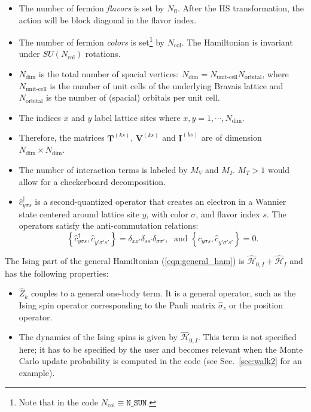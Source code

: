 \begin{itemize}
\item The number of fermion \emph{flavors} is set by $N_{\mathrm{fl}}$.  After the HS transformation, the action will be block diagonal in the flavor index. 
\item The number of fermion \emph{colors} is set\footnote{Note that  in the code $ N_{\mathrm{col}} \equiv \texttt{N\_{SUN}} $.} by $N_{\mathrm{col}}$.    The Hamiltonian is invariant under  $SU(N_{\mathrm{col}})$  rotations. 
\item $N_{\mathrm{dim}}$ is the total number of spacial vertices: $N_{\mathrm{dim}}=N_{\text{unit-cell}} N_{\mathrm{orbital}}$, where $N_{\text{unit-cell}}$ is the number of unit cells of the underlying Bravais lattice and $N_{\mathrm{orbital}}$ is the number of (spacial) orbitals per unit cell.
\item The indices $x$ and $y$ label lattice sites where $x,y=1,\cdots, N_{\mathrm{dim}}$. 
\item Therefore, the  matrices $\bm{T}^{(k s)}$, $\bm{V}^{(ks)}$  and $\bm{I}^{(ks)}$ are  of dimension $N_{\mathrm{dim}}\times N_{\mathrm{dim}}$.
\item The number of interaction terms  is labeled by $M_V$   and $M_I$.   $M_T> 1 $ would allow for a checkerboard decomposition.
\item $\hat{c}^{\dagger}_{y \sigma s} $ is a second-quantized operator that creates an electron in a Wannier state centered around lattice site $y$, with color $\sigma$, and  flavor index $s$.  The operators satisfy the anti-commutation relations: 
\begin{equation}
	\left\{ \hat{c}^{\dagger}_{y \sigma s},    \hat{c}^{\phantom\dagger}_{y' \sigma' s'}  \right\}   =   \delta_{xx'}  \delta_{ss'} \delta_{\sigma\sigma'},   
	\; \text{ and } \left\{ \hat{c}^{\phantom\dagger}_{y \sigma s},    \hat{c}^{\phantom\dagger}_{y' \sigma' s'}  \right\}   =0.
\end{equation}

\end{itemize}
The Ising part of the general Hamiltonian (\ref{eqn:general_ham}) is $\hat{\mathcal{H}}_{0,I}+ \hat{\mathcal{H}}_{I}$ and  has the following properties:
\begin{itemize}
\item $\hat{Z}_k$ couples to a general one-body term. It is a general operator, such as the Ising spin operator corresponding to the Pauli matrix $\hat{\sigma}_{z}$ or the position operator.
\item  The dynamics of the Ising spins is given by $\hat{\mathcal{H}}_{0,I}$. This term is not specified here; 
it has to be specified by the user and becomes relevant when the Monte Carlo update probability is computed in the code (see Sec.~\ref{sec:walk2} for an example).
\end{itemize}
